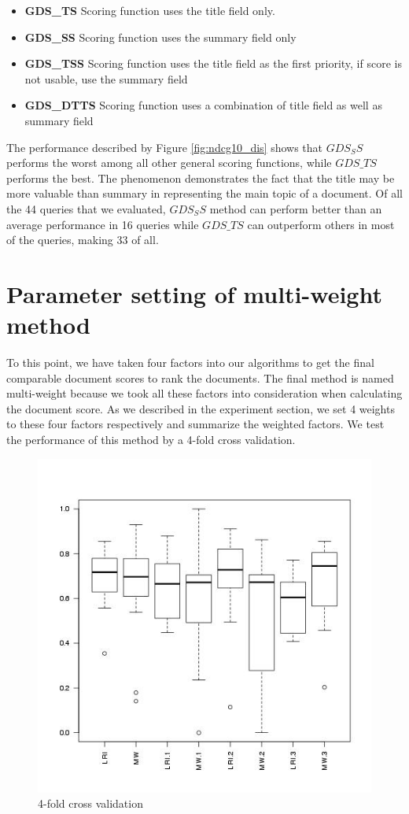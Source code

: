 \begin{itemize}
\item
\textbf{GDS\_TS} Scoring function uses the title field only.
\item
\textbf{GDS\_SS} Scoring function uses the summary field only
\item
\textbf{GDS\_TSS} Scoring function uses the title field as the first priority, if score is not usable, use the summary field
\item
\textbf{GDS\_DTTS} Scoring function uses a combination of title field as well as summary field
\end{itemize}

The performance described by Figure \ref{fig:ndcg10_dis} shows that $GDS_SS$ performs the worst among all other general scoring functions, while $GDS\_TS$ performs the best. The phenomenon demonstrates the fact that the title may be more valuable than summary in representing the main topic of a document. Of all the 44 queries that we evaluated, $GDS_SS$ method can perform better than an average performance in 16 queries while $GDS\_TS$ can outperform others in most of the queries, making 33 of all.

\section{Parameter setting of multi-weight method}
To this point, we have taken four factors into our algorithms to get the final comparable document scores to rank the documents. The final method is named multi-weight because we took all these factors into consideration when calculating the document score. As we described in the experiment section, we set 4 weights to these four factors respectively and summarize the weighted factors. We test the performance of this method by a 4-fold cross validation.  

\begin{figure}
\includegraphics[scale=0.6]{images/4-fold}
\caption{4-fold cross validation}
\label{fig:4-fold}
\end{figure}

